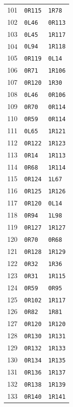 \begin{longtable}{rll}
101 & \texttt{0R115} & \texttt{1R78}\\
102 & \texttt{0L46} & \texttt{0R113}\\
103 & \texttt{0L45} & \texttt{1R117}\\
104 & \texttt{0L94} & \texttt{1R118}\\
105 & \texttt{0R119} & \texttt{0L14}\\
106 & \texttt{0R71} & \texttt{1R106}\\
107 & \texttt{0R120} & \texttt{1R30}\\
108 & \texttt{0L46} & \texttt{0R106}\\
109 & \texttt{0R70} & \texttt{0R114}\\
110 & \texttt{0R59} & \texttt{0R114}\\
111 & \texttt{0L65} & \texttt{1R121}\\
112 & \texttt{0R122} & \texttt{1R123}\\
113 & \texttt{0R14} & \texttt{1R113}\\
114 & \texttt{0R68} & \texttt{1R114}\\
115 & \texttt{0R124} & \texttt{1L67}\\
116 & \texttt{0R125} & \texttt{1R126}\\
117 & \texttt{0R120} & \texttt{0L14}\\
118 & \texttt{0R94} & \texttt{1L98}\\
119 & \texttt{0R127} & \texttt{1R127}\\
120 & \texttt{0R70} & \texttt{0R68}\\
121 & \texttt{0R128} & \texttt{1R129}\\
122 & \texttt{0R32} & \texttt{1R36}\\
123 & \texttt{0R31} & \texttt{1R115}\\
124 & \texttt{0R59} & \texttt{0R95}\\
125 & \texttt{0R102} & \texttt{1R117}\\
126 & \texttt{0R82} & \texttt{1R81}\\
127 & \texttt{0R120} & \texttt{1R120}\\
128 & \texttt{0R130} & \texttt{1R131}\\
129 & \texttt{0R132} & \texttt{1R133}\\
130 & \texttt{0R134} & \texttt{1R135}\\
131 & \texttt{0R136} & \texttt{1R137}\\
132 & \texttt{0R138} & \texttt{1R139}\\
133 & \texttt{0R140} & \texttt{1R141}\\

\end{longtable}
